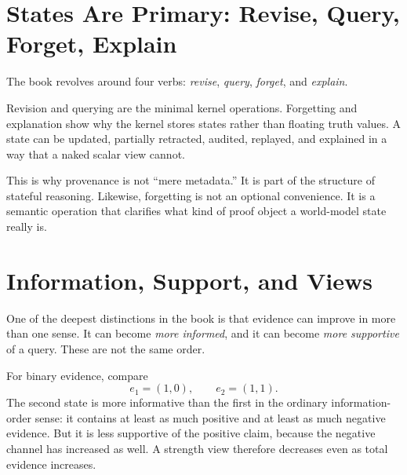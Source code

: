 \documentclass[11pt,openany]{report}
\begin{document}
\section{States Are Primary: Revise, Query, Forget, Explain}
\label{sec:overview-four-verbs}

The book revolves around four verbs:
\emph{revise}, \emph{query}, \emph{forget}, and \emph{explain}.

Revision and querying are the minimal kernel operations.  Forgetting and
explanation show why the kernel stores states rather than floating truth values.
A state can be updated, partially retracted, audited, replayed, and explained in
a way that a naked scalar view cannot.


This is why provenance is not ``mere metadata.''  It is part of the structure of
stateful reasoning.  Likewise, forgetting is not an optional convenience.  It is a
semantic operation that clarifies what kind of proof object a world-model
state really is.

\section{Information, Support, and Views}
\label{sec:overview-views}

One of the deepest distinctions in the book is that evidence can improve in
more than one sense.  It can become \emph{more informed}, and it can become
\emph{more supportive} of a query.  These are not the same order.

For binary evidence, compare
\[
  e_1 = (1,0),
  \qquad
  e_2 = (1,1).
\]
The second state is more informative than the first in the ordinary
information-order sense: it contains at least as much positive and at least as
much negative evidence.  But it is less supportive of the positive claim,
because the negative channel has increased as well.  A strength view therefore
decreases even as total evidence increases.
\end{document}
